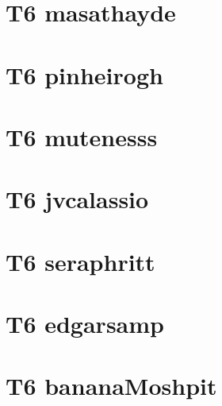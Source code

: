 

\chapter{T6 masathayde}



\chapter{T6 pinheirogh}


\chapter{T6 mutenesss}


\chapter{T6 jvcalassio}


\chapter{T6 seraphritt}


\chapter{T6 edgarsamp}



\chapter{T6 bananaMoshpit}


